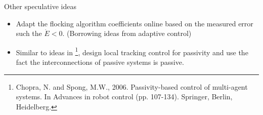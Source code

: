 \begin{frame}{Other speculative ideas}
	\
	\begin{itemize}
		\item Adapt the flocking algorithm coefficients online based on the measured error such the $\dot{E}<0$. (Borrowing ideas from adaptive control)
		\item Similar to ideas in \footnote{Chopra, N. and Spong, M.W., 2006. Passivity-based control of multi-agent systems. In Advances in robot control (pp. 107-134). Springer, Berlin, Heidelberg.}, design local tracking control for passivity and use the fact the interconnections of passive systems is passive.
	\end{itemize}
\end{frame}
